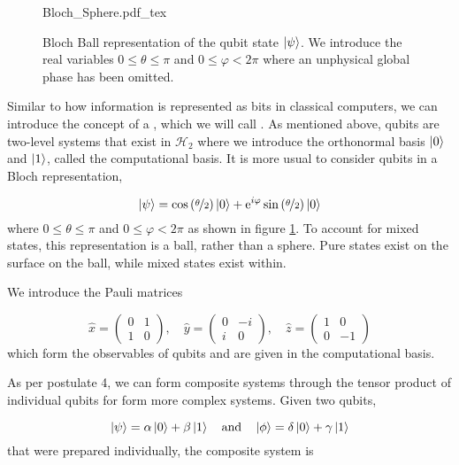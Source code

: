 \begin{figure}
	\centering
	\def\svgwidth{0.4\textwidth}
   	{Bloch_Sphere.pdf_tex}
   	\caption[Bloch sphere representation of a qubit]{Bloch Ball representation of the qubit state $\ket{\psi}$. We introduce the real variables $0\le\theta\le\pi$ and $0\le\varphi<2\pi$ where an unphysical global phase has been omitted.}
   	\label{fig:bloch}
\end{figure}

Similar to how information is represented as bits in classical computers, we can introduce the concept of a , which we will call . As mentioned above, qubits are two-level systems that exist in $\mathcal{H}_2$ where we introduce the orthonormal basis $\ket{0}$ and $\ket{1}$, called the computational basis. It is more usual to consider qubits in a Bloch representation,

\begin{equation}
	\ket{\psi} = \cos\left(\nicefrac{\theta}{2}\right)\ket{0} + \mathrm{e}^{i\varphi}\sin\left(\nicefrac{\theta}{2}\right)\ket{0}
\end{equation}
where $0\le\theta\le\pi$ and $0\le\varphi<2\pi$ as shown in figure \ref{fig:bloch}. To account for mixed states, this representation is a ball, rather than a sphere. Pure states exist on the surface on the ball, while mixed states exist within.

We introduce the Pauli matrices

\begin{equation}
	\hat{x} = \left(\begin{matrix}
		0 & 1 \\
		1 & 0
	\end{matrix}\right),
	\quad
	\hat{y} = \left(\begin{matrix}
		0 & -i \\
		i & 0
	\end{matrix}\right),
	\quad
	\hat{z} = \left(\begin{matrix}
		1 & 0 \\
		0 & -1
	\end{matrix}\right)
\end{equation}
which form the observables of qubits and are given in the computational basis. 

As per postulate 4, we can form composite systems through the tensor product of individual qubits for form more complex systems. Given two qubits,

\begin{equation}
	\ket{\psi} = \alpha\ket{0} + \beta\ket{1} \quad \text{and} \quad \ket{\phi} = \delta\ket{0} + \gamma\ket{1}
\end{equation} 
that were prepared individually, the composite system is

